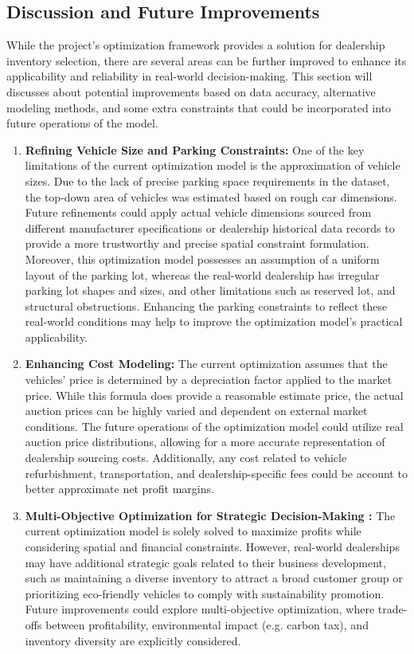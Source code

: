 \documentclass{article}
\begin{document}
\subsection{Discussion and Future Improvements}

While the project’s optimization framework provides a solution for dealership inventory selection, there are several areas can be further improved to enhance its applicability and reliability in real-world decision-making. This section will discusses about potential improvements based on data accuracy, alternative modeling methods, and some extra constraints that could be incorporated into future operations of the model.

\begin{enumerate}
    \item \textbf{Refining Vehicle Size and Parking Constraints:} 
One of the key limitations of the current optimization model is the approximation of vehicle sizes. Due to the lack of precise parking space requirements in the dataset, the top-down area of vehicles was estimated based on rough car dimensions. Future refinements could apply actual vehicle dimensions sourced from different manufacturer specifications or dealership historical data records to provide a more trustworthy and precise spatial constraint formulation. Moreover, this optimization model possesses an assumption of a uniform layout of the parking lot, whereas the real-world dealership has irregular parking lot shapes and sizes, and other limitations such as reserved lot, and structural obstructions. Enhancing the parking constraints to reflect these real-world conditions may help to improve the optimization model's practical applicability.

    \item \textbf{Enhancing Cost Modeling:}
The current optimization assumes that the vehicles’ price is determined by a depreciation factor applied to the market price. While this formula does provide a reasonable estimate price, the actual auction prices can be highly varied and dependent on external market conditions. The future operations of the optimization model could utilize real auction price distributions, allowing for a more accurate representation of dealership sourcing costs. Additionally, any cost related to vehicle refurbishment, transportation, and dealership-specific fees could be account to better approximate net profit margins.

    \item \textbf{Multi-Objective Optimization for Strategic Decision-Making
    :} 
The current optimization model is solely solved to maximize profits while considering spatial and financial constraints. However, real-world dealerships may have additional strategic goals related to their business development, such as maintaining a diverse inventory to attract a broad customer group or prioritizing eco-friendly vehicles to comply with sustainability promotion. Future improvements could explore multi-objective optimization, where trade-offs between profitability, environmental impact (e.g. carbon tax), and inventory diversity are explicitly considered.


\end{enumerate}
\end{document}
